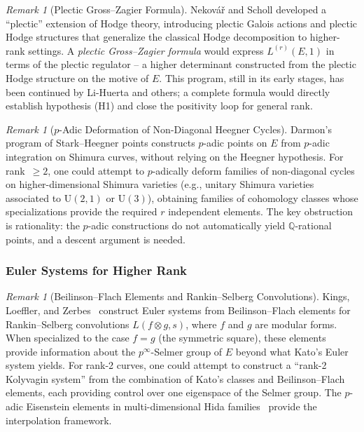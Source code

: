 \documentclass[aps,prd,twocolumn,superscriptaddress,nofootinbib,floatfix]{revtex4-2}
\theoremstyle{definition}
\theoremstyle{remark}
\newtheorem{remark}[theorem]{Remark}
\begin{document}
\begin{remark}[Plectic Gross--Zagier Formula]
\label{rem:plectic-gz}
Nekovář and Scholl developed a ``plectic'' extension of Hodge theory, introducing plectic Galois actions and plectic Hodge structures that generalize the classical Hodge decomposition to higher-rank settings. A \textit{plectic Gross--Zagier formula} would express $L^{(r)}(E,1)$ in terms of the plectic regulator -- a higher determinant constructed from the plectic Hodge structure on the motive of $E$. This program, still in its early stages, has been continued by Li-Huerta and others; a complete formula would directly establish hypothesis (H1) and close the positivity loop for general rank.
\end{remark}

\begin{remark}[$p$-Adic Deformation of Non-Diagonal Heegner Cycles]
\label{rem:p-adic-deformation}
Darmon's program of Stark--Heegner points constructs $p$-adic points on $E$ from $p$-adic integration on Shimura curves, without relying on the Heegner hypothesis. For rank~$\geq 2$, one could attempt to $p$-adically deform families of non-diagonal cycles on higher-dimensional Shimura varieties (e.g., unitary Shimura varieties associated to $\mathrm{U}(2,1)$ or $\mathrm{U}(3)$), obtaining families of cohomology classes whose specializations provide the required $r$ independent elements. The key obstruction is rationality: the $p$-adic constructions do not automatically yield $\mathbb{Q}$-rational points, and a descent argument is needed.
\end{remark}

\subsubsection{Euler Systems for Higher Rank}

\begin{remark}[Beilinson--Flach Elements and Rankin--Selberg Convolutions]
\label{rem:beilinson-flach}
Kings, Loeffler, and Zerbes~\cite{KLZ2017} construct Euler systems from Beilinson--Flach elements for Rankin--Selberg convolutions $L(f \otimes g, s)$, where $f$ and $g$ are modular forms. When specialized to the case $f = g$ (the symmetric square), these elements provide information about the $p^\infty$-Selmer group of $E$ beyond what Kato's Euler system yields. For rank-2 curves, one could attempt to construct a ``rank-2 Kolyvagin system'' from the combination of Kato's classes and Beilinson--Flach elements, each providing control over one eigenspace of the Selmer group. The $p$-adic Eisenstein elements in multi-dimensional Hida families~\cite{LLZ2014} provide the interpolation framework.
\end{remark}
\end{document}
